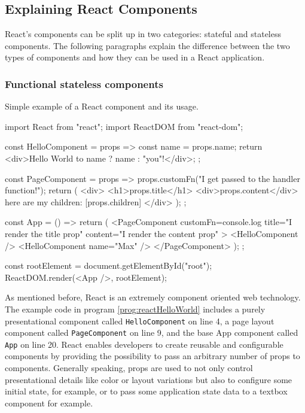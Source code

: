 \subsection{Explaining React Components}
\label{sec:reactComponents}

React's components can be split up in two categories: stateful and stateless components. The following paragraphs explain the difference between the two types of components and how they can be used in a React application.

\subsubsection{Functional stateless components}

\begin{program}
\caption{Simple example of a React component and its usage.} 
\label{prog:reactHelloWorld}
\begin{JsCode}
import React from "react";
import ReactDOM from "react-dom";

const HelloComponent = props => {
  const name = props.name;
  return <div>Hello World to {name ? name : "you"}!</div>;
};

const PageComponent = props => {
  props.customFn("I get passed to the handler function!");
  return (
    <div>
      <h1>{props.title}</h1>
      <div>{props.content}</div>
      here are my children: [{props.children}]
    </div>
  );
};

const App = () => {
  return (
    <PageComponent
      customFn={console.log}
      title="I render the title prop"
      content="I render the content prop"
    >
      <HelloComponent />
      <HelloComponent name={"Max"} />
    </PageComponent>
  );
};

const rootElement = document.getElementById("root");
ReactDOM.render(<App />, rootElement);  
\end{JsCode}
\end{program}

As mentioned before, React is an extremely component oriented web technology. The example code in program \ref{prog:reactHelloWorld} includes a purely presentational component called \texttt{Hello\-Component} on line 4, a page layout component called \texttt{PageComponent} on line 9, and the base App component called \texttt{App} on line 20. React enables developers to create reusable and configurable components by providing the possibility to pass an arbitrary number of props to components. Generally speaking, props are used to not only control presentational details like color or layout variations but also to configure some initial state, for example, or to pass some application state data to a textbox component for example.

